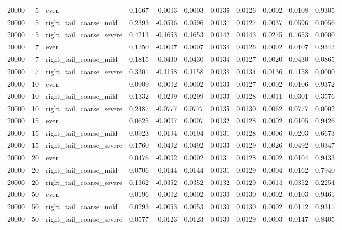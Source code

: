 \begin{table}[!h]
{\begin{tabular}[t]{rrlrrrrrrrr}
20000 & 5 & even & 0.1667 & -0.0003 & 0.0003 & 0.0136 & 0.0126 & 0.0002 & 0.0108 & 0.9305\\
20000 & 5 & right\_tail\_coarse\_mild & 0.2393 & -0.0596 & 0.0596 & 0.0137 & 0.0127 & 0.0037 & 0.0596 & 0.0056\\
20000 & 5 & right\_tail\_coarse\_severe & 0.4213 & -0.1653 & 0.1653 & 0.0142 & 0.0143 & 0.0275 & 0.1653 & 0.0000\\
20000 & 7 & even & 0.1250 & -0.0007 & 0.0007 & 0.0134 & 0.0126 & 0.0002 & 0.0107 & 0.9342\\
20000 & 7 & right\_tail\_coarse\_mild & 0.1815 & -0.0430 & 0.0430 & 0.0134 & 0.0127 & 0.0020 & 0.0430 & 0.0865\\
20000 & 7 & right\_tail\_coarse\_severe & 0.3301 & -0.1158 & 0.1158 & 0.0138 & 0.0134 & 0.0136 & 0.1158 & 0.0000\\
20000 & 10 & even & 0.0909 & -0.0002 & 0.0002 & 0.0133 & 0.0127 & 0.0002 & 0.0106 & 0.9372\\
20000 & 10 & right\_tail\_coarse\_mild & 0.1332 & -0.0299 & 0.0299 & 0.0133 & 0.0128 & 0.0011 & 0.0301 & 0.3576\\
20000 & 10 & right\_tail\_coarse\_severe & 0.2487 & -0.0777 & 0.0777 & 0.0135 & 0.0130 & 0.0062 & 0.0777 & 0.0002\\
20000 & 15 & even & 0.0625 & -0.0007 & 0.0007 & 0.0132 & 0.0128 & 0.0002 & 0.0105 & 0.9426\\
20000 & 15 & right\_tail\_coarse\_mild & 0.0923 & -0.0194 & 0.0194 & 0.0131 & 0.0128 & 0.0006 & 0.0203 & 0.6673\\
20000 & 15 & right\_tail\_coarse\_severe & 0.1760 & -0.0492 & 0.0492 & 0.0133 & 0.0129 & 0.0026 & 0.0492 & 0.0347\\
20000 & 20 & even & 0.0476 & -0.0002 & 0.0002 & 0.0131 & 0.0128 & 0.0002 & 0.0104 & 0.9433\\
20000 & 20 & right\_tail\_coarse\_mild & 0.0706 & -0.0144 & 0.0144 & 0.0131 & 0.0129 & 0.0004 & 0.0162 & 0.7940\\
20000 & 20 & right\_tail\_coarse\_severe & 0.1362 & -0.0352 & 0.0352 & 0.0132 & 0.0129 & 0.0014 & 0.0352 & 0.2254\\
20000 & 50 & even & 0.0196 & -0.0002 & 0.0002 & 0.0130 & 0.0130 & 0.0002 & 0.0103 & 0.9461\\
20000 & 50 & right\_tail\_coarse\_mild & 0.0293 & -0.0053 & 0.0053 & 0.0130 & 0.0130 & 0.0002 & 0.0112 & 0.9311\\
20000 & 50 & right\_tail\_coarse\_severe & 0.0577 & -0.0123 & 0.0123 & 0.0130 & 0.0129 & 0.0003 & 0.0147 & 0.8405\\
\bottomrule
\end{tabular}}
\end{table}